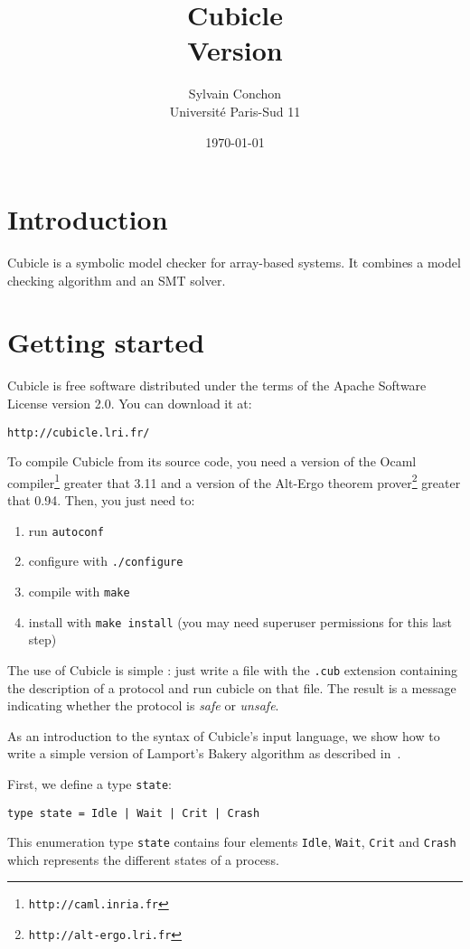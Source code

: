 \documentclass[a4paper,12pt]{article}
\title{\textbf{\Huge Cubicle}\\\Large Version \version}
\author{{\Large Sylvain Conchon} \\[1em] Universit\'e Paris-Sud 11}
\date\today
\begin{document}
\maketitle

\newpage

\section{Introduction}

Cubicle is a symbolic model checker for array-based systems. It
combines a model checking algorithm and an SMT solver.

\section{Getting started}

Cubicle is free software distributed under the terms of the Apache
Software License version 2.0. You can download it at:

\begin{center}
  \texttt{http://cubicle.lri.fr/}
\end{center}

To compile Cubicle from its source code, you need a version of the
Ocaml compiler\footnote{\texttt{http://caml.inria.fr}} greater that
3.11 and a version of the Alt-Ergo theorem
prover\footnote{\texttt{http://alt-ergo.lri.fr}} greater that
0.94. Then, you just need to:

\begin{enumerate}
  \item run \texttt{autoconf}
  \item configure with \texttt{./configure}
  \item compile with \texttt{make}
  \item install with \texttt{make install} (you may need superuser
    permissions for this last step)
\end{enumerate}

The use of Cubicle is simple : just write a file with the
\texttt{.cub} extension containing the description of a protocol and
run cubicle on that file. The result is a message indicating whether
the protocol is \emph{safe} or \emph{unsafe}.

As an introduction to the syntax of Cubicle's input language, we show
how to write a simple version of Lamport's Bakery algorithm as
described in~\cite{Abdulla}.

First, we define a type \texttt{state}:
\begin{verbatim}
type state = Idle | Wait | Crit | Crash
\end{verbatim}
%
This enumeration type \texttt{state} contains four elements
\texttt{Idle}, \texttt{Wait}, \texttt{Crit} and \texttt{Crash} which
represents the different states of a process.
\end{document}
